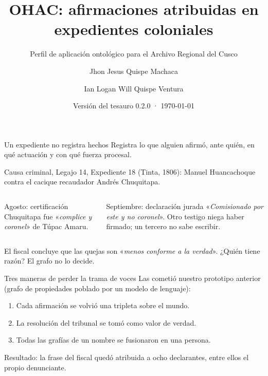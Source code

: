 \documentclass[aspectratio=169,11pt]{beamer}
\title{OHAC: afirmaciones atribuidas en expedientes coloniales}
\subtitle{Perfil de aplicación ontológico para el Archivo Regional del Cusco}
\author{Jhon Jesus Quispe Machaca \and Ian Logan Will Quispe Ventura}
\institute{Universidad Nacional de San Antonio Abad del Cusco}
\date{Versión del tesauro 0.2.0 · \today}
\newcommand{\cita}[1]{«\textit{#1}»}
\begin{document}
\maketitle

\begin{frame}{Un expediente no registra hechos}
Registra lo que \alert{alguien afirmó}, ante quién, en qué actuación y con qué fuerza procesal.

\medskip
Causa criminal, Legajo 14, Expediente 18 (Tinta, 1806): Manuel Huancachoque contra el cacique recaudador
Andrés Chuquitapa.

\begin{columns}[T]
\begin{block}{Agosto: certificación}
Chuquitapa fue \cita{complice y coronel} de Túpac Amaru.
\end{block}
\begin{block}{Septiembre: declaración jurada}
\cita{Comisionado por este y no coronel}. Otro testigo niega haber firmado; un tercero no sabe escribir.
\end{block}
\end{columns}

\medskip
El fiscal concluye que las quejas son \cita{menos conforme a la verdad}. ¿Quién tiene razón? El grafo no lo decide.
\end{frame}

\begin{frame}{Tres maneras de perder la trama de voces}
Las cometió nuestro prototipo anterior (grafo de propiedades poblado por un modelo de lenguaje):
\begin{enumerate}
\item Cada afirmación se volvió una tripleta \alert{sobre el mundo}.
\item La resolución del tribunal se tomó como \alert{valor de verdad}.
\item Todas las grafías de un nombre se \alert{fusionaron} en una persona.
\end{enumerate}
\medskip
Resultado: la frase del fiscal quedó atribuida a ocho declarantes, entre ellos el propio denunciante.
\end{frame}
\end{document}

